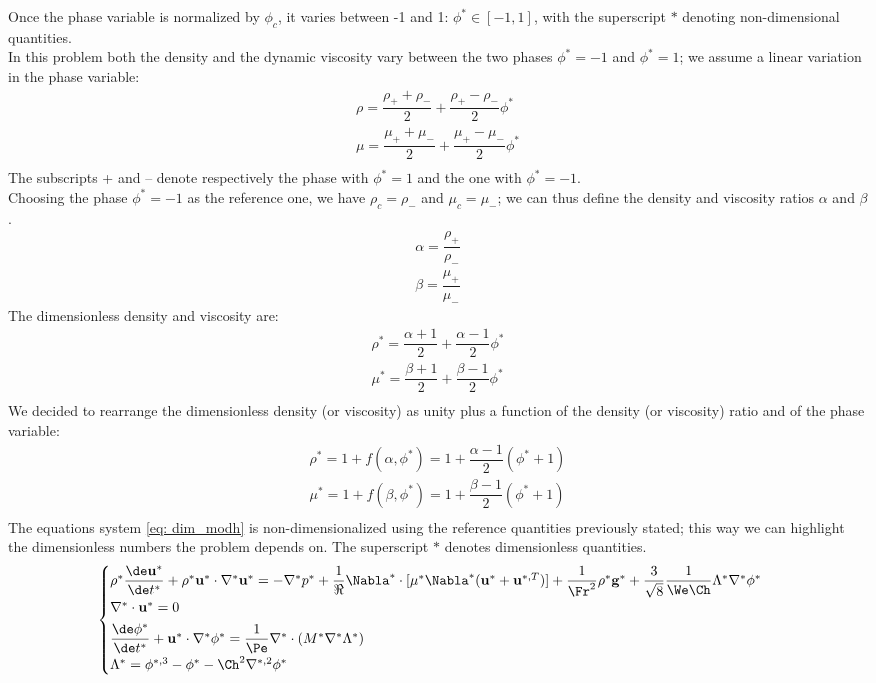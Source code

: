 Once the phase variable is normalized by $\phi_c$, it varies between -1 and 1: $\phi^*\in[-1,1]$, with the superscript $*$ denoting non-dimensional quantities.\\
In this problem both the density and the dynamic viscosity vary between the two phases $\phi^*=-1$ and $\phi^*=1$; we assume a linear variation in the phase variable:
\[
\begin{array}{l}
\rho=\dfrac{\rho_++\rho_-}{2}+\dfrac{\rho_+-\rho_-}{2}\phi^*\\[2ex]
\mu=\dfrac{\mu_++\mu_-}{2}+\dfrac{\mu_+-\mu_-}{2}\phi^*\\
\end{array}
\]
The subscripts + and -- denote respectively the phase with $\phi^*=1$ and the one with $\phi^*=-1$.\\
Choosing the phase $\phi^*=-1$ as the reference one, we have $\rho_c=\rho_-$ and $\mu_c=\mu_-$; we can thus define the density and viscosity ratios $\alpha$ and $\beta$.
\[
\begin{array}{l}
\alpha=\dfrac{\rho_+}{\rho_-}\\[2ex]
\beta=\dfrac{\mu_+}{\mu_-}
\end{array}
\]
The dimensionless density and viscosity are:
\[
\begin{array}{l}
\rho^*=\dfrac{\alpha+1}{2}+\dfrac{\alpha-1}{2}\phi^*\\[2ex]
\mu^*=\dfrac{\beta+1}{2}+\dfrac{\beta-1}{2}\phi^*\\
\end{array}
\]
We decided to rearrange the dimensionless density (or viscosity) as unity plus a function of the density (or viscosity) ratio and of the phase variable:
\[
\begin{array}{l}
\rho^*=1+f(\alpha,\phi^*)=1+\dfrac{\alpha-1}{2}(\phi^*+1)\\[2ex]
\mu^*=1+f(\beta,\phi^*)=1+\dfrac{\beta-1}{2}(\phi^*+1)\\
\end{array}
\]
The equations system \ref{eq: dim_modh} is non-dimensionalized using the reference quantities previously stated; this way we can highlight the dimensionless numbers the problem depends on. The superscript $*$ denotes dimensionless quantities.
\[
\begin{cases}
\rho^* \dfrac{\de \mathbf u^*}{\de t^*} +\rho^* \mathbf u^* \cdot \nabla^* \mathbf u^* =-\nabla^* p^* +\dfrac{1}{\Re} \Nabla^*\cdot[\mu^*\Nabla^*( \mathbf u^*+\mathbf u^{*,T})]+\dfrac{1}{\Fr^2}\rho^*\mathbf g^*+\dfrac{3}{\sqrt8}\dfrac{1}{\We\Ch}\Lambda^* \nabla^*\phi^*\\[1ex]
\nabla^*\cdot \mathbf u^* =0\\[1ex]
\dfrac{\de \phi^*}{\de t^*} +\mathbf u^* \cdot \nabla^* \phi^*=\dfrac{1}{\Pe}\nabla^*\cdot(M^*\nabla^* \Lambda^*) \\[1ex]
\Lambda^*=\phi^{*,3}- \phi^*-\Ch^2\nabla^{*,2} \phi^*
\end{cases}
\]
